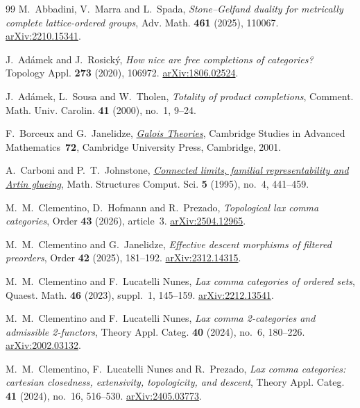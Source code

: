\documentclass[11pt,a4paper]{amsart}
\theoremstyle{definition}
\numberwithin{equation}{section}
\begin{document}
\begin{thebibliography}{99}
 M.~Abbadini, V.~Marra and L.~Spada,
\emph{Stone--Gelfand duality for metrically complete lattice-ordered groups},
Adv. Math. \textbf{461} (2025), 110067. \href{https://arxiv.org/abs/2210.15341}{arXiv:2210.15341}.

 J.~Ad\'amek and J.~Rosick\'y,
\emph{How nice are free completions of categories?}
Topology Appl. \textbf{273} (2020), 106972. \href{https://arxiv.org/abs/1806.02524}{arXiv:1806.02524}.

 J.~Ad\'amek, L.~Sousa and W.~Tholen,
\emph{Totality of product completions},
Comment. Math. Univ. Carolin. \textbf{41} (2000), no.~1, 9--24.

 F.~Borceux and G.~Janelidze,
\href{https://doi.org/10.1017/CBO9780511619939}{\emph{Galois Theories}},
Cambridge Studies in Advanced Mathematics~\textbf{72},
Cambridge University Press, Cambridge, 2001.

 A.~Carboni and P.~T.~Johnstone,
\href{https://doi.org/10.1017/S0960129500001183}{\emph{Connected limits, familial representability and Artin glueing}},
Math. Structures Comput. Sci. \textbf{5} (1995), no.~4, 441--459.

 M.~M.~Clementino, D.~Hofmann and R.~Prezado,
\emph{Topological lax comma categories},
Order \textbf{43} (2026), article~3. \href{https://arxiv.org/abs/2504.12965}{arXiv:2504.12965}.

 M.~M.~Clementino and G.~Janelidze,
\emph{Effective descent morphisms of filtered preorders},
Order \textbf{42} (2025), 181--192. \href{https://arxiv.org/abs/2312.14315}{arXiv:2312.14315}.

 M.~M.~Clementino and F.~Lucatelli Nunes,
\emph{Lax comma categories of ordered sets},
Quaest. Math. \textbf{46} (2023), suppl.~1, 145--159. \href{https://arxiv.org/abs/2212.13541}{arXiv:2212.13541}.

 M.~M.~Clementino and F.~Lucatelli Nunes,
\emph{Lax comma 2-categories and admissible 2-functors},
Theory Appl. Categ. \textbf{40} (2024), no.~6, 180--226. \href{https://arxiv.org/abs/2002.03132}{arXiv:2002.03132}.

 M.~M.~Clementino, F.~Lucatelli Nunes and R.~Prezado,
\emph{Lax comma categories: cartesian closedness, extensivity, topologicity, and descent},
Theory Appl. Categ. \textbf{41} (2024), no.~16, 516--530. \href{https://arxiv.org/abs/2405.03773}{arXiv:2405.03773}.


\end{thebibliography}
\end{document}
